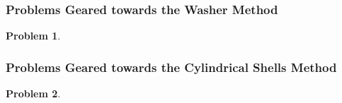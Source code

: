 \documentclass{article}
\newtheorem{problem}{Problem}
\begin{document}
\subsubsection{Problems Geared towards the Washer Method}\label{secMPSvolumesSolidsRevolutionWashers}
\begin{problem}

\end{problem}


\subsubsection{Problems Geared towards the Cylindrical Shells Method}\label{secMPSvolumesSolidsRevolutionShells}
\begin{problem}

\end{problem}
\end{document}
